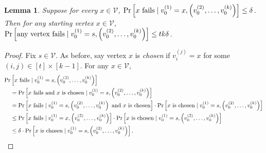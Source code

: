 \documentclass{report}
\newtheorem{lemma}[theorem]{Lemma}
\begin{document}
\begin{lemma} \label{lem:rw:startbound}
Suppose for every $x \in \mathcal{V}$, $\Pr \left [\textnormal{$x$ fails} \mid v_0^{(1)} = x, \left (v_0^{(2)}, \dots, v_0^{(k)} \right ) \right ] \leq \delta$.
Then for any starting vertex $x \in \mathcal{V}$, $\Pr \left [\textnormal{any vertex fails} \mid v_0^{(1)} = s, \left (v_0^{(2)}, \dots, v_0^{(k)} \right ) \right ] \leq tk\delta$.
\end{lemma}
%
\begin{proof}
Fix $s \in \mathcal{V}$.
As before, say vertex $x$ is \emph{chosen} if $v_i^{(j)} = x$ for some $(i, j) \in [t] \times [k-1]$.
For any $x \in \mathcal{V}$, 
%
\begin{align}
\nonumber
\Pr& \left [ \textnormal{$x$ fails} \mid v_0^{(1)} = s, \left (v_0^{(2)}, \dots, v_0^{(k)} \right ) \right ]
\\
\nonumber
&=
\Pr \left [ \textnormal{$x$ fails and $x$ is chosen} \mid v_0^{(1)} = s, \left (v_0^{(2)}, \dots, v_0^{(k)} \right ) \right ]
\\
\nonumber
&=
\Pr \left [ \textnormal{$x$ fails} \mid v_0^{(1)} = s, \left (v_0^{(2)}, \dots, v_0^{(k)} \right ) \textnormal{ and $x$ is chosen} \right ] \cdot
\Pr \left [ \textnormal{$x$ is chosen} \mid v_0^{(1)} = s, \left (v_0^{(2)}, \dots, v_0^{(k)} \right ) \right ]
\\
\nonumber
&\leq
\Pr \left [ \textnormal{$x$ fails} \mid v_0^{(1)} = x, \left (v_0^{(2)}, \dots, v_0^{(k)} \right ) \right ] \cdot
\Pr \left [ \textnormal{$x$ is chosen} \mid v_0^{(1)} = s, \left (v_0^{(2)}, \dots, v_0^{(k)} \right ) \right ]
\\
\label{eq:rw:sample:fail:prob}
&\leq
\delta \cdot
\Pr \left [ \textnormal{$x$ is chosen} \mid v_0^{(1)} = s, \left (v_0^{(2)}, \dots, v_0^{(k)} \right ) \right ].
\end{align}
%


\end{proof}
\end{document}
